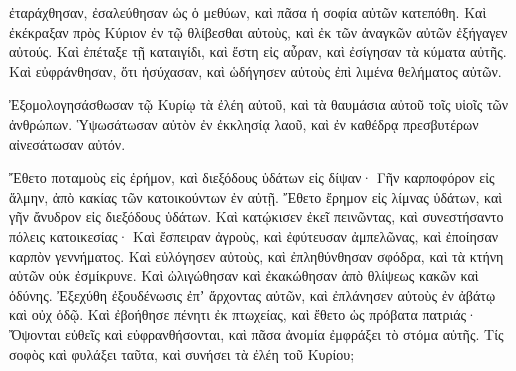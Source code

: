 {ἐταράχθησαν, ἐσαλεύθησαν ὡς ὁ μεθύων, καὶ πᾶσα ἡ σοφία αὐτῶν κατεπόθη.
Καὶ ἐκέκραξαν πρὸς Κύριον ἐν τῷ θλίβεσθαι αὐτοὺς, καὶ ἐκ τῶν ἀναγκῶν αὐτῶν ἐξήγαγεν αὐτούς.
Καὶ ἐπέταξε τῇ καταιγίδι, καὶ ἔστη εἰς αὖραν, καὶ ἐσίγησαν τὰ κύματα αὐτῆς.
Καὶ εὐφράνθησαν, ὅτι ἡσύχασαν, καὶ ὡδήγησεν αὐτοὺς ἐπὶ λιμένα θελήματος αὐτῶν.
\par }{\PP {}Ἐξομολογησάσθωσαν τῷ Κυρίῳ τὰ ἐλέη αὐτοῦ, καὶ τὰ θαυμάσια αὐτοῦ τοῖς υἱοῖς τῶν ἀνθρώπων.
Ὑψωσάτωσαν αὐτὸν ἐν ἐκκλησίᾳ λαοῦ, καὶ ἐν καθέδρᾳ πρεσβυτέρων αἰνεσάτωσαν αὐτόν.
\par }{\PP {}Ἔθετο ποταμοὺς εἰς ἐρήμον, καὶ διεξόδους ὑδάτων εἰς δίψαν·
Γῆν καρποφόρον εἰς ἅλμην, ἀπὸ κακίας τῶν κατοικούντων ἐν αὐτῇ.
Ἔθετο ἔρημον εἰς λίμνας ὑδάτων, καὶ γῆν ἄνυδρον εἰς διεξόδους ὑδάτων.
Καὶ κατῴκισεν ἐκεῖ πεινῶντας, καὶ συνεστήσαντο πόλεις κατοικεσίας·
Καὶ ἔσπειραν ἀγροὺς, καὶ ἐφύτευσαν ἀμπελῶνας, καὶ ἐποίησαν καρπὸν γεννήματος.
Καὶ εὐλόγησεν αὐτοὺς, καὶ ἐπληθύνθησαν σφόδρα, καὶ τὰ κτήνη αὐτῶν οὐκ ἐσμίκρυνε.
Καὶ ὠλιγώθησαν καὶ ἐκακώθησαν ἀπὸ θλίψεως κακῶν καὶ ὀδύνης.
Ἐξεχύθη ἐξουδένωσις ἐπʼ ἄρχοντας αὐτῶν, καὶ ἐπλάνησεν αὐτοὺς ἐν ἀβάτῳ καὶ οὐχ ὁδῷ.
Καὶ ἐβοήθησε πένητι ἐκ πτωχείας, καὶ ἔθετο ὡς πρόβατα πατριάς·
Ὄψονται εὐθεῖς καὶ εὐφρανθήσονται, καὶ πᾶσα ἀνομία ἐμφράξει τὸ στόμα αὐτῆς.
Τίς σοφὸς καὶ φυλάξει ταῦτα, καὶ συνήσει τὰ ἐλέη τοῦ Κυρίου;

\par }
